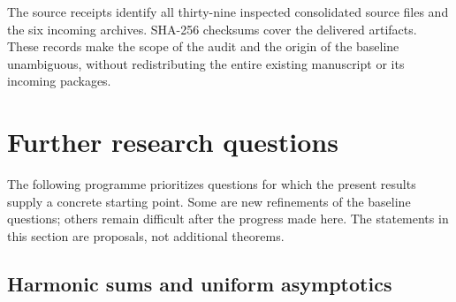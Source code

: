 \documentclass[11pt,a4paper]{article}
\numberwithin{equation}{section}
\theoremstyle{plain}
\theoremstyle{definition}
\theoremstyle{remark}
\begin{document}
The source receipts identify all thirty-nine inspected consolidated
source files and the six incoming archives. SHA-256 checksums cover
the delivered artifacts. These records make the scope of the audit
and the origin of the baseline unambiguous, without redistributing
the entire existing manuscript or its incoming packages.


\section{Further research questions}
\label{cont:sec:questions}

The following programme prioritizes questions for which the present
results supply a concrete starting point. Some are new refinements
of the baseline questions; others remain difficult after the
progress made here. The statements in this section are proposals,
not additional theorems.

\subsection{Harmonic sums and uniform asymptotics}
\end{document}
